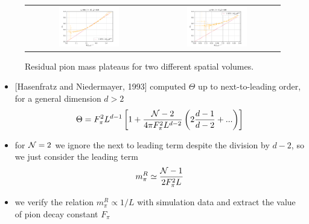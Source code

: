 \documentclass[a4paper,11pt]{article}
\begin{document}
\begin{figure}
  \begin{tabular}{cc}
    \includegraphics[width=0.5\textwidth]{figs/Mpi10x64} &
    \includegraphics[width=0.5\textwidth]{figs/Mpi6x64Pt10}
  \end{tabular}
  \caption{Residual pion mass plateaus for two different spatial volumes.}
\end{figure}

  \begin{itemize}
    \item {[Hasenfratz and Niedermayer, 1993]} computed $\Theta$
      up to next-to-leading order, for a general dimension $d > 2$
            \[
        \Theta = F_\pi^2 L^{d-1} \left[1 +
          \frac{{\cal N} - 2}{4\pi F_\pi^2 L^{d-2}}
          \left(2\frac{d - 1}{d - 2} + ...\right) \right]
      \]
    \item for ${\cal N} = 2$ we ignore the next to leading term despite
      the division by $d - 2$,
      so we just consider the leading term
      \[
        m_\pi^R \simeq \frac{{\cal N} - 1}{2F_\pi^2 L}
      \]
    \item we verify the relation $m_\pi^R \propto 1 / L$ with
      simulation data and extract the value of pion decay
      constant $F_\pi$
  \end{itemize}
\end{document}
